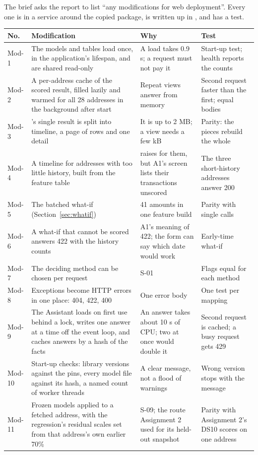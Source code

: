The brief asks the report to list ``any modifications for web deployment''. Every one is in a
service around the copied package, is written up in , and has a test.

{\small
\begin{longtable}{@{}L{1.2cm}L{5.4cm}L{4.4cm}L{3.0cm}@{}}
\toprule
\textbf{No.} & \textbf{Modification} & \textbf{Why} & \textbf{Test} \\
\midrule
\endhead
Mod-1 & The models and tables load once, in the application's lifespan, and are shared read-only & A load takes 0.9 s; a request must not pay it & Start-up test; health reports the counts \\
Mod-2 & A per-address cache of the scored result, filled lazily and warmed for all 28 addresses in the background after start & Repeat views answer from memory & Second request faster than the first; equal bodies \\
Mod-3 & 's single result is split into timeline, a page of rows and one detail & It is up to 2 MB; a view needs a few kB & Parity: the pieces rebuild the whole \\
Mod-4 & A timeline for addresses with too little history, built from the feature table &  raises for them, but A1's screen lists their transactions unscored & The three short-history addresses answer 200 \\
Mod-5 & The batched what-if (Section~\ref{sec:whatif}) & 41 amounts in one feature build & Parity with single calls \\
Mod-6 & A what-if that cannot be scored answers 422 with the history counts & A1's meaning of 422; the form can say which date would work & Early-time what-if \\
Mod-7 & The deciding method can be chosen per request & S-01 & Flags equal  for each method \\
Mod-8 & Exceptions become HTTP errors in one place:  404,  422,  400 & One error body & One test per mapping \\
Mod-9 & The Assistant loads on first use behind a lock, writes one answer at a time off the event loop, and caches answers by a hash of the facts & An answer takes about 10 s of CPU; two at once would double it & Second request is cached; a busy request gets 429 \\
Mod-10 & Start-up checks: library versions against the pins, every model file against its hash, a named count of worker threads & A clear message, not a flood of warnings & Wrong version stops with the message \\
Mod-11 & Frozen models applied to a fetched address, with the regression's residual scales set from that address's own earlier 70\% & S-09; the route Assignment 2 used for its held-out snapshot & Parity with Assignment 2's DS10 scores on one address \\
\bottomrule
\end{longtable}
}

